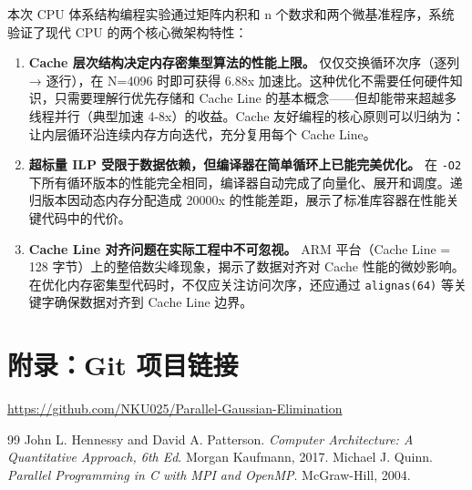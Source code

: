 \documentclass[a4paper]{article}
\begin{document}
本次 CPU 体系结构编程实验通过矩阵内积和 n 个数求和两个微基准程序，系统验证了现代 CPU 的两个核心微架构特性：

\begin{enumerate}
    \item \textbf{Cache 层次结构决定内存密集型算法的性能上限。} 仅仅交换循环次序（逐列 → 逐行），在 N=4096 时即可获得 6.88x 加速比。这种优化不需要任何硬件知识，只需要理解行优先存储和 Cache Line 的基本概念——但却能带来超越多线程并行（典型加速 4-8x）的收益。Cache 友好编程的核心原则可以归纳为：让内层循环沿连续内存方向迭代，充分复用每个 Cache Line。
    \item \textbf{超标量 ILP 受限于数据依赖，但编译器在简单循环上已能完美优化。} 在 \texttt{-O2} 下所有循环版本的性能完全相同，编译器自动完成了向量化、展开和调度。递归版本因动态内存分配造成 20000x 的性能差距，展示了标准库容器在性能关键代码中的代价。
    \item \textbf{Cache Line 对齐问题在实际工程中不可忽视。} ARM 平台（Cache Line = 128 字节）上的整倍数尖峰现象，揭示了数据对齐对 Cache 性能的微妙影响。在优化内存密集型代码时，不仅应关注访问次序，还应通过 \texttt{alignas(64)} 等关键字确保数据对齐到 Cache Line 边界。
\end{enumerate}

\newpage
\section*{附录：Git 项目链接}
\url{https://github.com/NKU025/Parallel-Gaussian-Elimination}

\renewcommand{\refname}{参考文献}
\begin{thebibliography}{99}
 John L. Hennessy and David A. Patterson. \textit{Computer Architecture: A Quantitative Approach, 6th Ed}. Morgan Kaufmann, 2017.
 Michael J. Quinn. \textit{Parallel Programming in C with MPI and OpenMP}. McGraw-Hill, 2004.
\end{thebibliography}
\end{document}
